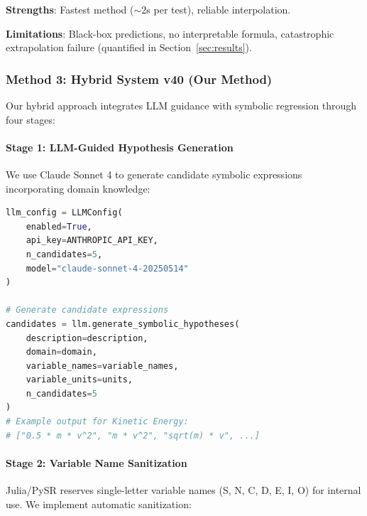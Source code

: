 \documentclass[twoside,11pt]{article}
\begin{document}
\textbf{Strengths}: Fastest method ($\sim$2s per test), reliable interpolation.

\textbf{Limitations}: Black-box predictions, no interpretable formula, catastrophic extrapolation failure (quantified in Section~\ref{sec:results}).

\subsubsection{Method 3: Hybrid System v40 (Our Method)}

Our hybrid approach integrates LLM guidance with symbolic regression through four stages:

\paragraph{Stage 1: LLM-Guided Hypothesis Generation}

We use Claude Sonnet 4 to generate candidate symbolic expressions incorporating domain knowledge:

\begin{lstlisting}[language=Python, caption=LLM Hypothesis Generation]
llm_config = LLMConfig(
    enabled=True,
    api_key=ANTHROPIC_API_KEY,
    n_candidates=5,
    model="claude-sonnet-4-20250514"
)

# Generate candidate expressions
candidates = llm.generate_symbolic_hypotheses(
    description=description,
    domain=domain,
    variable_names=variable_names,
    variable_units=units,
    n_candidates=5
)
# Example output for Kinetic Energy:
# ["0.5 * m * v^2", "m * v^2", "sqrt(m) * v", ...]
\end{lstlisting}

\paragraph{Stage 2: Variable Name Sanitization}

Julia/PySR reserves single-letter variable names (S, N, C, D, E, I, O) for internal use. We implement automatic sanitization:
\end{document}
